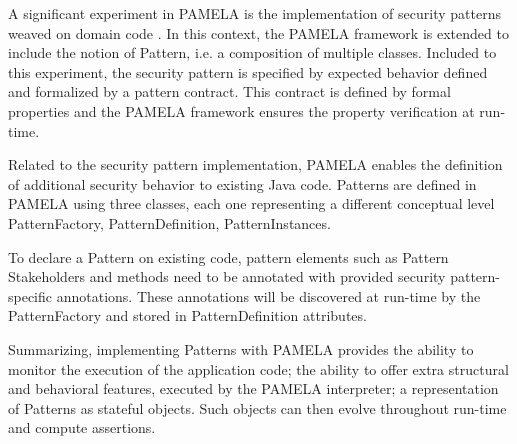 A significant experiment in PAMELA is the implementation of security patterns weaved on domain code \cite{silva20}.
In this context, the PAMELA framework is extended to include the notion of Pattern, i.e. a composition of multiple classes. Included to this experiment, the security pattern is specified by expected behavior defined and formalized by a pattern contract. This contract is defined by formal properties and the PAMELA framework ensures the property verification at run-time.

Related to the security pattern implementation, PAMELA enables the definition of additional security behavior to existing Java code.
Patterns are defined in PAMELA using three classes, each one representing a different conceptual level PatternFactory, PatternDefinition, PatternInstances.

To declare a Pattern on existing code, pattern elements such as Pattern Stakeholders and methods need to be annotated with provided security pattern-specific annotations. These annotations will be discovered at run-time by the PatternFactory and stored in PatternDefinition attributes.


Summarizing, implementing Patterns with PAMELA provides the ability to monitor the execution of the application code; the ability to offer extra structural and behavioral features, executed by the PAMELA interpreter; a representation of Patterns as stateful objects. Such objects can then evolve throughout run-time and compute assertions.








